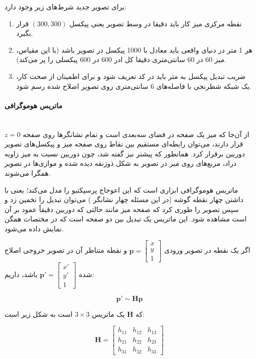 \documentclass{article}
\begin{document}
برای تصویر جدید شرط‌های زیر وجود دارد:
\begin{enumerate}
\item نقطه مرکزی میز کار باید دقیقا در وسط تصویر یعنی پیکسل $(300, 300)$ قرار بگیرد.
\item هر 1 متر در دنیای واقعی باید معادل با 1000 پیکسل در تصویر باشد (با این مقیاس، میز 60 در 60 سانتی‌متری دقیقا کل ادر 600 در 600 پیکسلی را پر می‌کند).
\item ضریب تبدیل پیکسل به متر باید در کد تعریف شود و برای اطمینان از صحت کار، یک شبکه شطرنجی  با فاصله‌های 6 سانتی‌متری روی تصویر اصلاح شده رسم شود.
\end{enumerate}

\paragraph{ماتریس هوموگرافی}\mbox{}\\
از آن‌جا که میز یک صفحه در فضای سه‌بعدی است و تمام نشانگرها روی صفحه $z = 0 $ قرار دارند، می‌توان رابطه‌ای مستقیم بین نقاط روی صفحه میز و پیکسل‌های تصویر دوربین برقرار کرد. همانطور که پیشتر نیز گفته شد، چون دوربین نسبت به میز زاویه دراد، مربع‌های روی میز در تصویر به شکل ذوزنقه دیده شده و موازی‌ها در تصویر همگرا می‌شوند. 

ماتریس هوموگرافی ابزاری است که این اعوجاج پرسپکتیو را مدل می‌کند؛ یعنی با داشتن چهار نقطه گوشه (در این مسئله چهار نشانگر ) می‌توان تبدیل را تخمین زد و سپس تصویر را طوری  کرد که صفحه میز مانند حالتی که دوربین دقیقاً عمود بر آن است مشاهده شود. این ماتریس یک تبدیل  بین دو صفحه است که در مختصات همگن نمایش داده می‌شود. 

اگر یک نقطه در تصویر ورودی $\mathbf{p} = \begin{bmatrix} x \\ y \\ 1 \end{bmatrix}$ و نقطه متناظر آن در تصویر خروجی اصلاح شده $\mathbf{p}' = \begin{bmatrix} x' \\ y' \\ 1 \end{bmatrix}$ باشد، داریم:

\[
\mathbf{p}' \sim \mathbf{H}\mathbf{p}
\]

که $\mathbf{H}$ یک ماتریس $3 \times 3$ است به شکل زیر است:

\[
\mathbf{H}=
\begin{bmatrix}
h_{11} & h_{12} & h_{13} \\
h_{21} & h_{22} & h_{23} \\
h_{31} & h_{32} & h_{33}
\end{bmatrix}
\]
\end{document}
